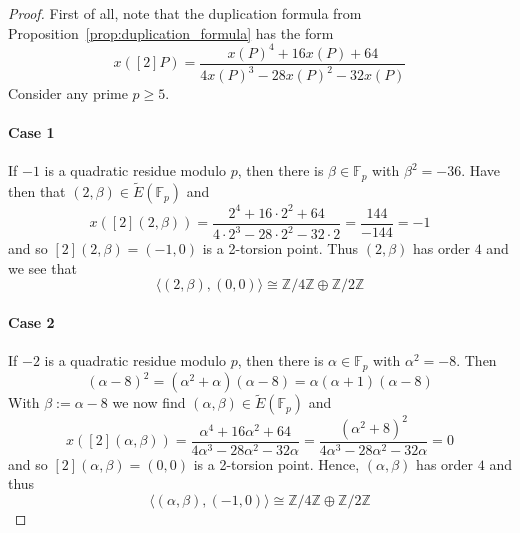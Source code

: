\documentclass{scrartcl}
\newcommand{\Z}{\mathbb{Z}}
\newcommand{\F}{\mathbb{F}}
\theoremstyle{definition}
\begin{document}
\begin{proof}
    First of all, note that the duplication formula from Proposition~\ref{prop:duplication_formula} has the form
    \begin{equation*}
        x([2]P) = \frac {x(P)^4 + 16 x(P) + 64} {4 x(P)^3 - 28 x(P)^2 - 32 x(P)}
    \end{equation*}
    Consider any prime $p \geq 5$.

    \paragraph{Case 1} If $-1$ is a quadratic residue modulo $p$, then there is $\beta \in \F_p$ with $\beta^2 = -36$.
    Have then that $(2, \beta) \in \tilde{E}(\F_p)$ and
    \begin{equation*}
        x([2](2, \beta)) = \frac {2^4 + 16 \cdot 2^2 + 64} {4 \cdot 2^3 - 28 \cdot 2^2 - 32 \cdot 2} = \frac {144} {-144} = -1
    \end{equation*}
    and so $[2](2, \beta) = (-1, 0)$ is a 2-torsion point.
    Thus $(2, \beta)$ has order $4$ and we see that
    \begin{equation*}
        \langle (2, \beta), (0, 0) \rangle \cong \Z/4\Z \oplus \Z/2\Z
    \end{equation*}

    \paragraph{Case 2} If $-2$ is a quadratic residue modulo $p$, then there is $\alpha \in \F_p$ with $\alpha^2 = -8$.
    Then
    \begin{equation*}
        (\alpha - 8)^2 = (\alpha^2 + \alpha)(\alpha - 8) = \alpha(\alpha + 1)(\alpha - 8)
    \end{equation*}
    With $\beta := \alpha - 8$ we now find $(\alpha, \beta) \in \tilde{E}(\F_p)$ and
    \begin{equation*}
        x([2](\alpha, \beta)) = \frac {\alpha^4 + 16 \alpha^2 + 64} {4 \alpha^3 - 28 \alpha^2 - 32 \alpha} = \frac {(\alpha^2 + 8)^2} {4 \alpha^3 - 28 \alpha^2 - 32 \alpha} = 0
    \end{equation*}
    and so $[2](\alpha, \beta) = (0, 0)$ is a 2-torsion point.
    Hence, $(\alpha, \beta)$ has order $4$ and thus
    \begin{equation*}
        \langle (\alpha, \beta), (-1, 0) \rangle \cong \Z/4\Z \oplus \Z/2\Z
    \end{equation*}


\end{proof}
\end{document}
